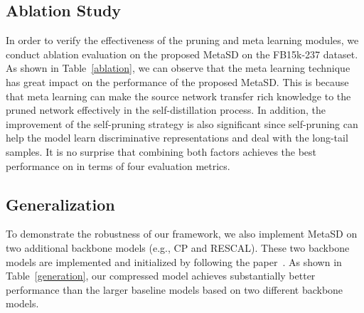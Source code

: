 \documentclass[11pt]{article}
\begin{document}
\begin{table}
\centering
{}
\caption{\label{ablation}
Results of ablation study on FB15k-237. $P$ and $M$ denote the pruning and meta learning techniques.
}
\end{table}
\subsection{Ablation Study}
In order to verify the effectiveness of the pruning and meta learning modules, we conduct ablation evaluation on the proposed MetaSD on the FB15k-237 dataset. As shown in Table~\ref{ablation}, we can observe that the meta learning technique has great impact on the performance of the proposed MetaSD. This is because that meta learning can make the source network transfer rich knowledge to the pruned network effectively in the self-distillation process. In addition, the improvement of the self-pruning strategy is also significant since self-pruning can help the model learn discriminative representations and deal with the long-tail samples.  It is no surprise that combining both factors achieves the best performance on in terms of four evaluation metrics.



\subsection{Generalization}
To demonstrate the robustness of our framework, we also implement MetaSD on two additional backbone models (e.g., CP and RESCAL).
These two backbone models are implemented and initialized by following the paper~\citep{zhang2020duality}.
As shown in Table~\ref{generation}, our compressed model achieves substantially better performance than the larger baseline models based on two different backbone models.
\end{document}
